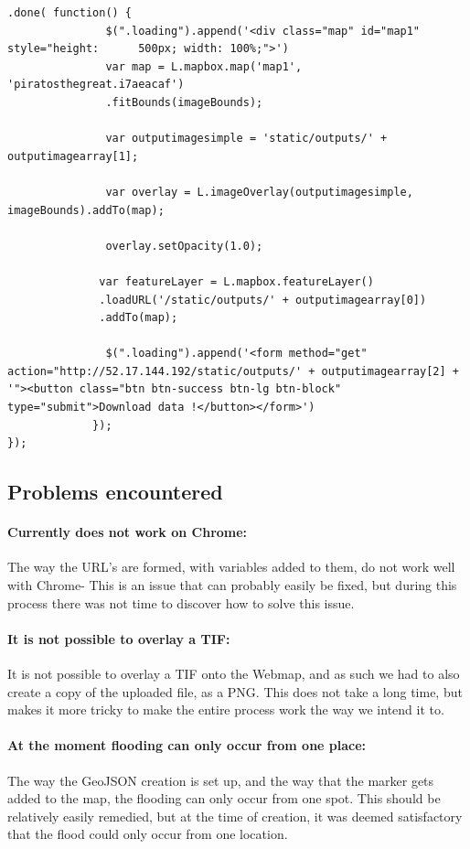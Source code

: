 \begin{lstlisting}
.done( function() {
               $(".loading").append('<div class="map" id="map1" style="height: 		500px; width: 100%;">')
               var map = L.mapbox.map('map1', 'piratosthegreat.i7aeacaf')
               .fitBounds(imageBounds);

               var outputimagesimple = 'static/outputs/' + outputimagearray[1];

               var overlay = L.imageOverlay(outputimagesimple, 				imageBounds).addTo(map);

               overlay.setOpacity(1.0);

              var featureLayer = L.mapbox.featureLayer()
              .loadURL('/static/outputs/' + outputimagearray[0])
              .addTo(map);

               $(".loading").append('<form method="get" action="http://52.17.144.192/static/outputs/' + outputimagearray[2] + '"><button class="btn btn-success btn-lg btn-block" type="submit">Download data !</button></form>')
             });
});
\end{lstlisting}

\subsection{Problems encountered}
\paragraph{Currently does not work on Chrome:} The way the URL's are formed, with variables added to them, do not work well with Chrome- This is an issue that can probably easily be fixed, but during this process there was not time to discover how to solve this issue. 

\paragraph{It is not possible to overlay a TIF:}
It is not possible to overlay a TIF onto the Webmap, and as such we had to also create a copy of the uploaded file, as a PNG. This does not take a long time, but makes it more tricky to make the entire process work the way we intend it to.  

\paragraph{At the moment flooding can only occur from one place:}
The way the GeoJSON creation is set up, and the way that the marker gets added to the map, the flooding can only occur from one spot. This should be relatively easily remedied, but at the time of creation, it was deemed satisfactory that the flood could only occur from one location.
